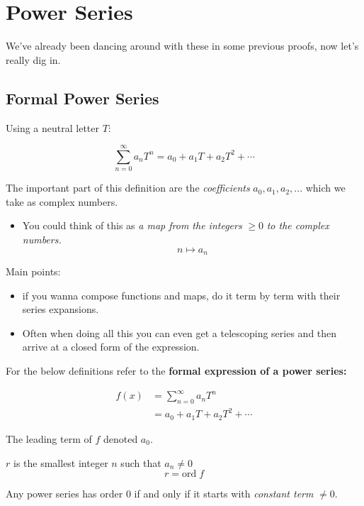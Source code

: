 \chapter{Power Series}
We've already been dancing around with these in some previous proofs, now let's really dig in. 
\section{Formal Power Series}
\begin{defn}
  Using a neutral letter $T$:

  \[\sum_{n = 0}^{\infty}a_n T^n = a_0 + a_1 T + a_2 T^2 + \cdots \]

\end{defn}
The important part of this definition are the \textit{coefficients} $a_0, a_1, a_2, ...$ which we 
take as complex numbers.
\begin{itemize}
  \item You could think of this as \textit{a map from the integers} $ \geq 0 $ \textit{to the complex numbers.}
  \[n \mapsto a_n \]
\end{itemize}

Main points: 
  \begin{itemize}
    \item if you wanna compose functions and maps, do it term by term with their series expansions.
    \item Often when doing all this you can even get a telescoping series and then arrive at a closed form of the expression. 
  \end{itemize}

For the below definitions refer to the \textbf{formal expression of a power series:}

\begin{align*}
  f(x) &= \sum_{n = 0}^{\infty} a_n T^n \\
  &= a_0 + a_1 T + a_2 T^2 + \cdots
\end{align*}

\begin{defn}
  The leading term of $f$ denoted $a_0$.
\end{defn}

\begin{defn}
  $r$ is the smallest integer $n$ such that $a_n \not = 0$
  \[r = \text{ord}\; f\]
\end{defn}

\begin{thm}
  Any power series has order $0$ if and only if it starts with \textit{constant term} $\not = 0.$
\end{thm}

